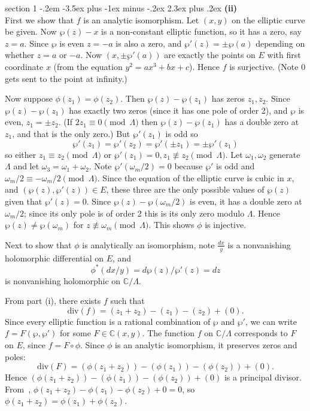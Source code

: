 \documentclass[12pt]{article}
\makeatletter
\theoremstyle{norm}
\newcommand{\C}[0]{\mathbb{C}}
\newcommand{\nequiv}[0]{\not\equiv}
\newcommand{\La}[0]{\Lambda}
\newcommand{\subprob}[1]{\noindent\textbf{#1}\\}
\newenvironment{problem}{\@startsection
       {section}
       {1}
       {-.2em}
       {-3.5ex plus -1ex minus -.2ex}
       {2.3ex plus .2ex}
       {\pagebreak[3]%
       \large\bf\noindent{Problem }
       }
       }
       {%
       }
\makeatother
\begin{document}
\begin{problem} {\it }
\subprob{(ii)}
First we show that $f$ is an analytic isomorphism. Let $(x,y)$ on the elliptic curve be given. Now $\wp(z)-x$ is a non-constant elliptic function, so it has a zero, say $z=a$. Since $\wp$ is even $z=-a$ is also a zero, and $\wp'(z)=\pm \wp(a)$ depending on whether $z=a$ or $-a$. Now $(x,\pm\wp'(a))$ are exactly the points on $E$ with first coordinate $x$ (from the equation $y^2=ax^3+bx+c$). Hence $f$ is surjective. (Note $0$ gets sent to the point at infinity.)

Now suppose $\phi(z_1)=\phi(z_2)$. %
Then $\wp(z)-\wp(z_1)$ has zeros $z_1,z_2$. Since $\wp(z)-\wp(z_1)$ has exactly two zeros (since it has one pole of order 2), and $\wp$ is even, $z_1=\pm z_2$. (If $2z_1\equiv 0\pmod{\La}$ then $\wp(z)-\wp(z_1)$ has a double zero at $z_1$, and that is the only zero.) But $\wp'(z_1)$ is odd so
\[
\wp'(z_1)=\wp'(z_2)=\wp'(\pm z_1)=\pm\wp'(z_1)
\]
so either $z_1\equiv z_2\pmod{\La}$ or $\wp'(z_1)=0,z_1\nequiv z_2\pmod{\La}$.
Let $\omega_1,\omega_2$ generate $\La$ and let $\omega_3=\omega_1+\omega_2$. 
 Note $\wp'(\omega_m/2)=0$ because $\wp'$ is odd and $\omega_m/2\equiv -\omega_m/2\pmod{\La}$.
Since the equation of the elliptic curve is cubic in $x$, and $(\wp(z),\wp'(z))\in E$, these three are the only possible values of $\wp(z)$ given that $\wp'(z)=0$. 
Since $\wp(z)-\wp(\omega_m/2)$ is even, it has a double zero at $\omega_m/2$; since its only pole is of order 2 this is its only zero modulo $\La$. Hence $\wp(z)\neq \wp(\omega_m)$ for $z\nequiv \omega_m\pmod{\La}$. This shows $\phi$ is injective.

Next to show that $\phi$ is analytically an isomorphism, note $\frac{dx}{y}$ is a nonvanishing holomorphic differential on $E$, and
\[\phi^*(dx/y)=d\wp(z)/\wp'(z)=dz\]
is nonvanishing holomorphic on $\C/\La$.


From part (i), there exists $f$ such that
\[\text{div}(f)=(z_1+z_2)-(z_1)-(z_2)+(0).\]
Since every elliptic function is a rational combination of $\wp$ and $\wp'$, we can write $f=F(\wp,\wp')$ for some $F\in \C(x,y)$. The function $f$ on $\C/\La$ corresponds to $F$ on $E$, since $f=F\circ \phi$. Since $\phi$ is an analytic isomorphism, it preserves zeros and poles:
\[
\text{div}(F)=(\phi(z_1+z_2))-(\phi(z_1))-(\phi(z_2))+(0).
\]
Hence $(\phi(z_1+z_2))-(\phi(z_1))-(\phi(z_2))+(0)$ is a principal divisor. 
From~\cite[III.3.5]{s}, $\phi(z_1+z_2)-\phi(z_1)-\phi(z_2)+0=0$, so $\phi(z_1+z_2)=\phi(z_1)+\phi(z_2)$. \\


\end{problem}
\end{document}
